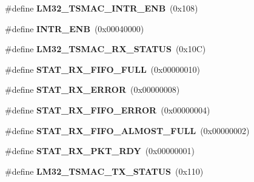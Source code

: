 \begin{DoxyCompactItemize}
\item 
\mbox{\label{group__lm32__tsmac_gadd8e8853cf3a8a10c0f76b633b82ad49}} 
\#define {\bfseries L\+M32\+\_\+\+T\+S\+M\+A\+C\+\_\+\+I\+N\+T\+R\+\_\+\+E\+NB}~(0x108)
\item 
\mbox{\label{group__lm32__tsmac_ga3accb8dc1f1f1314428f8bbfe91b64d8}} 
\#define {\bfseries I\+N\+T\+R\+\_\+\+E\+NB}~(0x00040000)
\item 
\mbox{\label{group__lm32__tsmac_gaceb20855df56675cbf5779c8e64a81ce}} 
\#define {\bfseries L\+M32\+\_\+\+T\+S\+M\+A\+C\+\_\+\+R\+X\+\_\+\+S\+T\+A\+T\+US}~(0x10\+C)
\item 
\mbox{\label{group__lm32__tsmac_gafaa13b6513cd4ffd48a10c7bc435f21b}} 
\#define {\bfseries S\+T\+A\+T\+\_\+\+R\+X\+\_\+\+F\+I\+F\+O\+\_\+\+F\+U\+LL}~(0x00000010)
\item 
\mbox{\label{group__lm32__tsmac_ga99a31f888c4eccc6225fd62a56137a6f}} 
\#define {\bfseries S\+T\+A\+T\+\_\+\+R\+X\+\_\+\+E\+R\+R\+OR}~(0x00000008)
\item 
\mbox{\label{group__lm32__tsmac_ga6cde5f9e7e90af393f943fe2e428c361}} 
\#define {\bfseries S\+T\+A\+T\+\_\+\+R\+X\+\_\+\+F\+I\+F\+O\+\_\+\+E\+R\+R\+OR}~(0x00000004)
\item 
\mbox{\label{group__lm32__tsmac_ga114d447336089e997b3f1b56dd38220c}} 
\#define {\bfseries S\+T\+A\+T\+\_\+\+R\+X\+\_\+\+F\+I\+F\+O\+\_\+\+A\+L\+M\+O\+S\+T\+\_\+\+F\+U\+LL}~(0x00000002)
\item 
\mbox{\label{group__lm32__tsmac_gaf53e137267da515fb7674dc90ab098d1}} 
\#define {\bfseries S\+T\+A\+T\+\_\+\+R\+X\+\_\+\+P\+K\+T\+\_\+\+R\+DY}~(0x00000001)
\item 
\mbox{\label{group__lm32__tsmac_ga997d01e71b3256e3189e4e85ba3ce128}} 
\#define {\bfseries L\+M32\+\_\+\+T\+S\+M\+A\+C\+\_\+\+T\+X\+\_\+\+S\+T\+A\+T\+US}~(0x110)
\item 
\mbox{\label{group__lm32__tsmac_ga2c1eaad33b210bf4ca2e85aac4ecdb70}} 

\end{DoxyCompactItemize}
